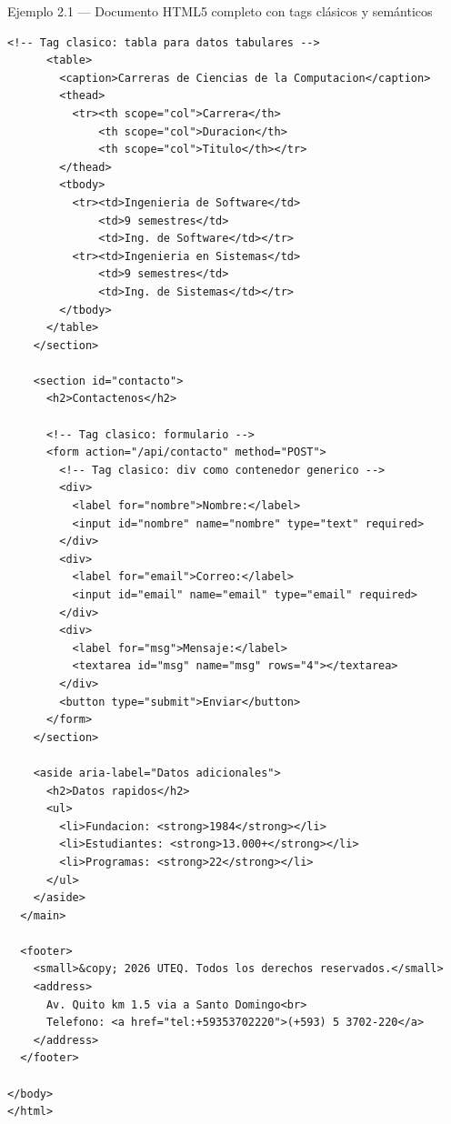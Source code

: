 \begin{cajaejemplo}{Ejemplo 2.1 --- Documento HTML5 completo con tags clásicos y semánticos}
\begin{lstlisting}[style=html,caption={pagina-completa.html},label=lst:2.1]
      <!-- Tag clasico: tabla para datos tabulares -->
      <table>
        <caption>Carreras de Ciencias de la Computacion</caption>
        <thead>
          <tr><th scope="col">Carrera</th>
              <th scope="col">Duracion</th>
              <th scope="col">Titulo</th></tr>
        </thead>
        <tbody>
          <tr><td>Ingenieria de Software</td>
              <td>9 semestres</td>
              <td>Ing. de Software</td></tr>
          <tr><td>Ingenieria en Sistemas</td>
              <td>9 semestres</td>
              <td>Ing. de Sistemas</td></tr>
        </tbody>
      </table>
    </section>

    <section id="contacto">
      <h2>Contactenos</h2>

      <!-- Tag clasico: formulario -->
      <form action="/api/contacto" method="POST">
        <!-- Tag clasico: div como contenedor generico -->
        <div>
          <label for="nombre">Nombre:</label>
          <input id="nombre" name="nombre" type="text" required>
        </div>
        <div>
          <label for="email">Correo:</label>
          <input id="email" name="email" type="email" required>
        </div>
        <div>
          <label for="msg">Mensaje:</label>
          <textarea id="msg" name="msg" rows="4"></textarea>
        </div>
        <button type="submit">Enviar</button>
      </form>
    </section>

    <aside aria-label="Datos adicionales">
      <h2>Datos rapidos</h2>
      <ul>
        <li>Fundacion: <strong>1984</strong></li>
        <li>Estudiantes: <strong>13.000+</strong></li>
        <li>Programas: <strong>22</strong></li>
      </ul>
    </aside>
  </main>

  <footer>
    <small>&copy; 2026 UTEQ. Todos los derechos reservados.</small>
    <address>
      Av. Quito km 1.5 via a Santo Domingo<br>
      Telefono: <a href="tel:+59353702220">(+593) 5 3702-220</a>
    </address>
  </footer>

</body>
</html>
\end{lstlisting}


\end{cajaejemplo}

